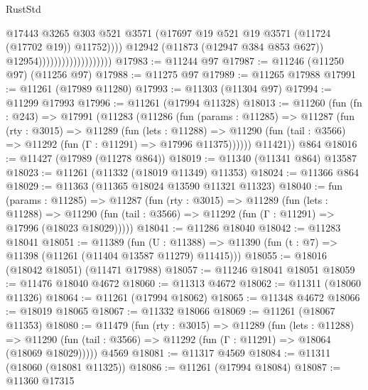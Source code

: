 \begin{lexlean}{RustStd}
\begin{coremodule}
                                                @17443
                                                @3265
                                                @303
                                                @521
                                                @3571
                                                (@17697
                                                  @19
                                                  @521
                                                  @19
                                                  @3571
                                                  (@11724 (@17702 @19))
                                                  @11752))))
                                          @12942
                                          (@11873 (@12947 @384 @853 @627))
                                          @12954)))))))))))))))))))
@17983 := @11244 @97
@17987 := @11246 (@11250 @97) (@11256 @97)
@17988 := @11275 @97
@17989 := @11265 @17988
@17991 := @11261 (@17989 @11280)
@17993 := @11303 (@11304 @97)
@17994 := @11299 @17993
@17996 := @11261 (@17994 @11328)
@18013 := @11260
    (fun (fn : @243) =>
    @17991
      (@11283
        (@11286
          (fun (params : @11285) =>
          @11287
            (fun (rty : @3015) =>
            @11289
              (fun (lets : @11288) =>
              @11290 (fun (tail : @3566) => @11292 (fun (Γ : @11291) => @17996 @11375))))))
        @11421))
    @864
@18016 := @11427 (@17989 (@11278 @864))
@18019 := @11340 (@11341 @864) @13587
@18023 := @11261 (@11332 (@18019 @11349) @11353)
@18024 := @11366 @864
@18029 := @11363 (@11365 @18024 @13590 @11321 @11323)
@18040 := fun (params : @11285) =>
  @11287
    (fun (rty : @3015) =>
    @11289
      (fun (lets : @11288) =>
      @11290 (fun (tail : @3566) => @11292 (fun (Γ : @11291) => @17996 (@18023 @18029)))))
@18041 := @11286 @18040
@18042 := @11283 @18041
@18051 := @11389
    (fun (U : @11388) => @11390 (fun (t : @7) => @11398 (@11261 (@11404 @13587 @11279) @11415)))
@18055 := @18016 (@18042 @18051) (@11471 @17988)
@18057 := @11246 @18041 @18051
@18059 := @11476 @18040 @4672
@18060 := @11313 @4672
@18062 := @11311 (@18060 @11326)
@18064 := @11261 (@17994 @18062)
@18065 := @11348 @4672
@18066 := @18019 @18065
@18067 := @11332 @18066
@18069 := @11261 (@18067 @11353)
@18080 := @11479
    (fun (rty : @3015) =>
    @11289
      (fun (lets : @11288) =>
      @11290 (fun (tail : @3566) => @11292 (fun (Γ : @11291) => @18064 (@18069 @18029)))))
    @4569
@18081 := @11317 @4569
@18084 := @11311 (@18060 (@18081 @11325))
@18086 := @11261 (@17994 @18084)
@18087 := @11360 @17315

\end{coremodule}
\end{lexlean}
